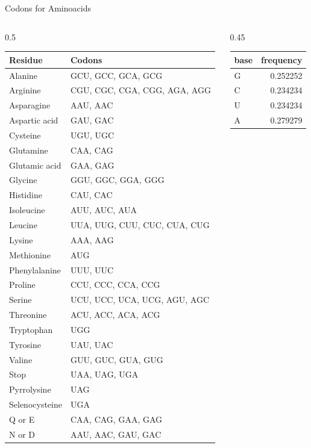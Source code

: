 \begin{frame}[shrink=45]{Codons for Aminoacids}
	\begin{columns}[T, totalwidth=\linewidth]
		\begin{column}{0.5\linewidth}
			\begin{tabular}{ll}
				Residue & Codons \\
				\midrule
				Alanine & GCU, GCC, GCA, GCG \\
				Arginine & CGU, CGC, CGA, CGG, AGA, AGG \\
				Asparagine & AAU, AAC \\
				Aspartic acid & GAU, GAC \\
				Cysteine & UGU, UGC \\
				Glutamine & CAA, CAG \\
				Glutamic acid & GAA, GAG \\
				Glycine & GGU, GGC, GGA, GGG \\
				Histidine & CAU, CAC \\
				Isoleucine & AUU, AUC, AUA \\
				Leucine & UUA, UUG, CUU, CUC, CUA, CUG \\
				Lysine & AAA, AAG \\
				Methionine & AUG \\
				Phenylalanine & UUU, UUC \\
				Proline & CCU, CCC, CCA, CCG \\
				Serine & UCU, UCC, UCA, UCG, AGU, AGC \\
				Threonine & ACU, ACC, ACA, ACG \\
				Tryptophan & UGG \\
				Tyrosine & UAU, UAC \\
				Valine & GUU, GUC, GUA, GUG \\
				Stop & UAA, UAG, UGA \\
				Pyrrolysine & UAG \\
				Selenocysteine & UGA \\
				Q or E & CAA, CAG, GAA, GAG \\
				N or D & AAU, AAC, GAU, GAC \\
				\bottomrule
			\end{tabular}
		\end{column}
		
		\begin{column}{0.45\linewidth}		
			\begin{tabular}{lr}
				\toprule
				base & frequency \\
				\midrule
				G & 0.252252 \\
				C & 0.234234 \\
				U & 0.234234 \\
				A & 0.279279 \\
				\bottomrule
			\end{tabular}				
			
		\end{column}
	\end{columns}
	\label{Appendix:codons}
\end{frame}


